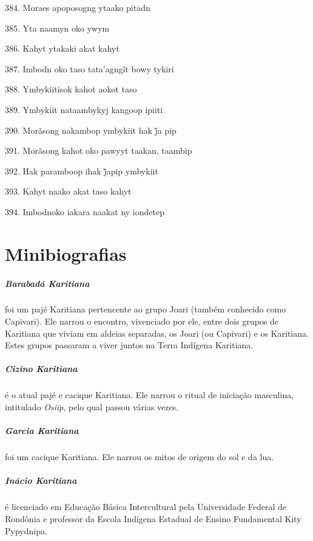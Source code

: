 384. Moraes apoposogng ytaako pitadn

385. Yta naamyn oko ywym

386. Kahyt ytakaki akat kahyt

387. Imbodn oko taso tata’agngĩt bowy tykiri

388. Ymbykiitisok kahot aokot taso

389. Ymbykiit nataambykyj kangoop ipiiti

390. Morãsong nakambop ymbykiit hak j̃a pip

391. Morãsong kahot oko pawyyt taakan, taambip

392. Hak paramboop ihak j̃apip ymbykiit

393. Kahyt naako akat taso kahyt

394. Imbodnoko iakara naakat ny iondetep

\endgroup

\chapter{Minibiografias}

\paragraph{Barabadá Karitiana} foi um pajé Karitiana pertencente ao grupo Joari
(também conhecido como Capivari). Ele narrou o encontro, vivenciado por
ele, entre dois grupos de Karitiana que viviam em aldeias separadas, os
Joari (ou Capivari) e os Karitiana. Estes grupos passaram a viver juntos
na Terra Indígena Karitiana.

\paragraph{Cizino Karitiana} é o atual pajé e cacique Karitiana. Ele narrou o ritual
de iniciação masculina, intitulado \emph{Osiip}, pelo qual passou várias
vezes.

\paragraph{Garcia Karitiana} foi um cacique Karitiana. Ele narrou os mitos de origem
do sol e da lua.

\paragraph{Inácio Karitiana} é licenciado em Educação Básica Intercultural pela
Universidade Federal de Rondônia e professor da Escola Indígena Estadual
de Ensino Fundamental Kity Pypydnipa.

